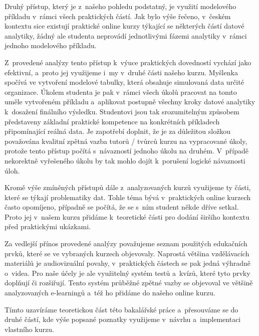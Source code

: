 Druhý přístup, který je z~našeho pohledu podstatný, je využití modelového příkladu v~rámci všech praktických částí. Jak bylo výše řečeno, v~českém kontextu sice existují praktické online kurzy týkající se některých částí datové analytiky, žádný ale studenta neprovádí jednotlivými fázemi analytiky v~rámci jednoho modelového příkladu.

Z~provedené analýzy tento přístup k~výuce praktických dovedností vychází jako efektivní, a~proto jej využijeme i~my v~druhé části našeho kurzu. Myšlenka spočívá ve vytvoření modelové tabulky, která obsahuje simulovaná data určité organizace. Úkolem studenta je pak v~rámci všech úkolů pracovat na tomto uměle vytvořeném příkladu a~aplikovat postupně všechny kroky datové analytiky k~dosažení finálního výsledku. Studentovi jsou tak srozumitelným způsobem představeny základní praktické kompetence na konkrétních příkladech připomínající reálná data. Je zapotřebí doplnit, že je za důležitou složkou považována kvalitní zpětná vazba tutorů / tvůrců kurzu na vypracované úkoly, protože tento přístup počítá s~návazností jednoho úkolu na druhém. V~případě nekorektně vyřešeného úkolu by tak mohlo dojít k~porušení logické návaznosti úloh.

Kromě výše zmíněných přístupů dále z~analyzovaných kurzů využijeme ty části, které se týkají problematiky dat. Tohle téma bývá v~praktických online kurzech často opomíjeno, případně se počítá, že se s~ním student někde dříve setkal. Proto jej v~našem kurzu přidáme k~teoretické části pro dodání širšího kontextu před praktickými ukázkami.

Za vedlejší přínos provedené analýzy považujeme seznam použitých edukačních prvků, které se ve vybraných kurzech objevovaly. Naprostá většina vzdělávacích materiálů je audiovizuální povahy, v~praktických částech se pak jedná výhradně o~videa. Pro naše účely je ale využitelný systém testů a~kvízů, které tyto prvky doplňují či rozšiřují. Tento systém průběžné zpětné vazby se objevoval ve většině analyzovaných e-learningů a~též ho přidáme do našeho online kurzu.

Tímto uzavíráme teoretickou část této bakalářské práce a~přesouváme se do druhé částí, kde výše popsané poznatky využijeme v~návrhu a~implementaci vlastního kurzu.
